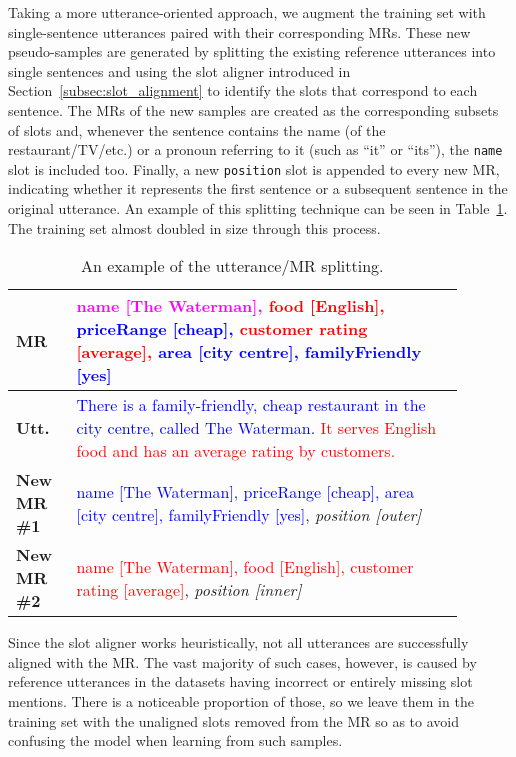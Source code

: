 \documentclass[11pt,a4paper]{article}
\begin{document}
Taking a more utterance-oriented approach, we augment the training set with single-sentence utterances paired with their corresponding MRs. These new pseudo-samples are generated by splitting the existing reference utterances into single sentences and using the slot aligner introduced in Section~\ref{subsec:slot_alignment} to identify the slots that correspond to each sentence. The MRs of the new samples are created as the corresponding subsets of slots and, whenever the sentence contains the name (of the restaurant/TV/etc.) or a pronoun referring to it (such as ``it'' or ``its''), the \texttt{name} slot is included too. Finally, a new \texttt{position} slot is appended to every new MR, indicating whether it represents the first sentence or a subsequent sentence in the original utterance. An example of this splitting technique can be seen in Table~\ref{table:utt_splitting_example}. The training set almost doubled in size through this process.

\begin{table}
    \small
   	\centering
    \begin{tabular}{>{\centering\arraybackslash} m{0.12\linewidth} m{0.77\linewidth} }
    	\toprule
    	\textbf{MR} & \textcolor{magenta}{name [The Waterman],} \textcolor{red}{food [English],} \textcolor{blue}{priceRange [cheap],} \textcolor{red}{customer rating [average],} \textcolor{blue}{area [city centre], familyFriendly [yes]} \\
        \midrule
        \textbf{Utt.} & \textcolor{blue}{There is a family-friendly, cheap restaurant in the city centre, called The Waterman.} \textcolor{red}{It serves English food and has an average rating by customers.} \\
        \midrule
        \textbf{New MR \#1} & \textcolor{blue}{name [The Waterman], priceRange [cheap], area [city centre], familyFriendly [yes]}, \emph{position [outer]} \\
        \midrule
        \textbf{New MR \#2} & \textcolor{red}{name [The Waterman], food [English], customer rating [average]}, \emph{position [inner]} \\
        \bottomrule
    \end{tabular}
  	\vspace{-0.3cm}
	\caption{An example of the utterance/MR splitting.}
    \label{table:utt_splitting_example}
  	\vspace{0.1cm}
\end{table}

Since the slot aligner works heuristically, not all utterances are successfully aligned with the MR. The vast majority of such cases, however, is caused by reference utterances in the datasets having incorrect or entirely missing slot mentions. There is a noticeable proportion of those, so we leave them in the training set with the unaligned slots removed from the MR so as to avoid confusing the model when learning from such samples.
\end{document}
